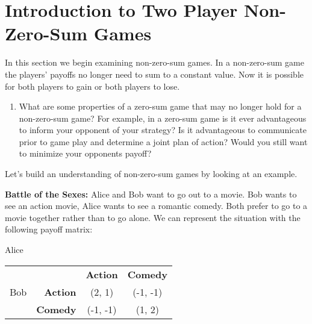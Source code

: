 
\section{Introduction to Two Player Non-Zero-Sum Games}



\vspace{.1in}
In this section we begin examining non-zero-sum games. In a non-zero-sum game the players' payoffs no longer need to sum to a constant value. Now it is possible for both players to gain or both players to lose.


\begin{enumerate}
\item What are some properties of a zero-sum game that may no longer hold for a non-zero-sum game? For example, in a zero-sum game is it ever advantageous to inform your opponent of your strategy? Is it advantageous to communicate prior to game play and determine a joint plan  of action? Would you still want to minimize your opponents payoff?
\end{enumerate}

Let's build an understanding of non-zero-sum games by looking at an example.

{\bf Battle of the Sexes:}  Alice and Bob  want to go out to a movie. Bob wants to see an action movie, Alice wants to see a romantic comedy. Both prefer to go to a movie together rather than to go alone. We can represent the situation with the following payoff matrix:

\hspace{3in}Alice

\begin{center}
\begin{tabular}{l|r|c|c|}\cline{2-4}
&&\textbf{Action}&\textbf{Comedy}\\ \cline{2-4}
Bob&\textbf{Action} &(2, 1)&(-1, -1)\\ \cline{2-4}
&\textbf{Comedy} &(-1, -1)&(1, 2)\\ \cline{2-4}
\end{tabular}
\end{center}
\vspace{.1in}

